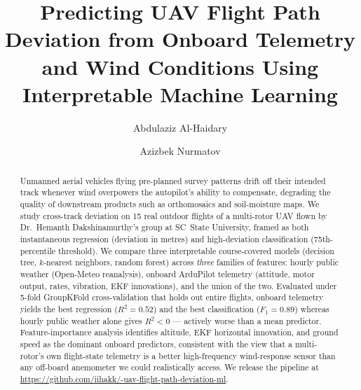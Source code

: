 \documentclass[sigconf, nonacm]{acmart}
\begin{document}
\title{Predicting UAV Flight Path Deviation from Onboard Telemetry and Wind
Conditions Using Interpretable Machine Learning}

\author{Abdulaziz Al-Haidary}

\author{Azizbek Nurmatov}

\begin{abstract}
Unmanned aerial vehicles flying pre-planned survey patterns drift off
their intended track whenever wind overpowers the autopilot's ability to
compensate, degrading the quality of downstream products such as
orthomosaics and soil-moisture maps.  We study cross-track deviation on
15 real outdoor flights of a multi-rotor UAV flown by Dr.\ Hemanth
Dakshinamurthy's group at SC~State University, framed as both
instantaneous regression (deviation in metres) and high-deviation
classification (75th-percentile threshold).  We compare three
interpretable course-covered models (decision tree, $k$-nearest
neighbors, random forest) across \emph{three} families of features:
hourly public weather (Open-Meteo reanalysis), onboard ArduPilot
telemetry (attitude, motor output, rates, vibration, EKF innovations),
and the union of the two.  Evaluated under 5-fold GroupKFold
cross-validation that holds out entire flights, onboard telemetry yields
the best regression ($R^2=0.52$) and the best classification ($F_1=0.89$)
whereas hourly public weather alone gives $R^2<0$ --- actively worse than
a mean predictor.  Feature-importance analysis identifies altitude, EKF
horizontal innovation, and ground speed as the dominant onboard
predictors, consistent with the view that a multi-rotor's own flight-state
telemetry is a better high-frequency wind-response sensor than any
off-board anemometer we could realistically access.  We release the
pipeline at \url{https://github.com/iihakk/-uav-flight-path-deviation-ml}.
\end{abstract}


\maketitle
\end{document}

